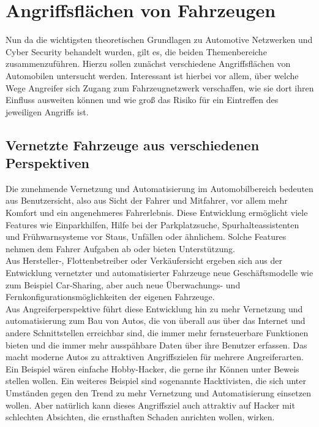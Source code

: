 






\chapter{Angriffsflächen von Fahrzeugen}
Nun da die wichtigsten theoretischen Grundlagen zu Automotive Netzwerken und Cyber Security behandelt wurden, gilt es, die beiden Themenbereiche zusammenzuführen. Hierzu sollen zunächst verschiedene Angriffsflächen von Automobilen untersucht werden. Interessant ist hierbei vor allem, über welche Wege Angreifer sich Zugang zum Fahrzeugnetzwerk verschaffen, wie sie dort ihren Einfluss ausweiten können und wie groß das Risiko für ein Eintreffen des jeweiligen Angriffs ist. 



\section{Vernetzte Fahrzeuge aus verschiedenen Perspektiven}
Die zunehmende Vernetzung und Automatisierung im Automobilbereich bedeuten aus Benutzersicht, also aus Sicht der Fahrer und Mitfahrer, vor allem mehr Komfort und ein angenehmeres Fahrerlebnis. Diese Entwicklung ermöglicht viele Features wie Einparkhilfen, Hilfe bei der Parkplatzsuche, Spurhalteassistenten und Frühwarnsysteme vor Staus, Unfällen oder ähnlichem. Solche Features nehmen dem Fahrer Aufgaben ab oder bieten Unterstützung. \\
Aus Hersteller-, Flottenbetreiber oder Verkäufersicht ergeben sich aus der Entwicklung vernetzter und automatisierter Fahrzeuge neue Geschäftsmodelle wie zum Beispiel Car-Sharing, aber auch neue Überwachungs- und Fernkonfigurationsmöglichkeiten der eigenen Fahrzeuge. \\
Aus Angreiferperspektive führt diese Entwicklung hin zu mehr Vernetzung und automatisierung zum Bau von Autos, die von überall aus über das Internet und andere Schnittstellen erreichbar sind, die immer mehr fernsteuerbare Funktionen bieten und die immer mehr ausspähbare Daten über ihre Benutzer erfassen. Das macht moderne Autos zu attraktiven Angriffszielen für mehrere Angreiferarten. Ein Beispiel wären einfache Hobby-Hacker, die gerne ihr Können unter Beweis stellen wollen. Ein weiteres Beispiel sind sogenannte Hacktivisten, die sich unter Umständen gegen den Trend zu mehr Vernetzung und Automatisierung einsetzen wollen. Aber natürlich kann dieses Angriffsziel auch attraktiv auf Hacker mit schlechten Absichten, die ernsthaften Schaden anrichten wollen, wirken.


